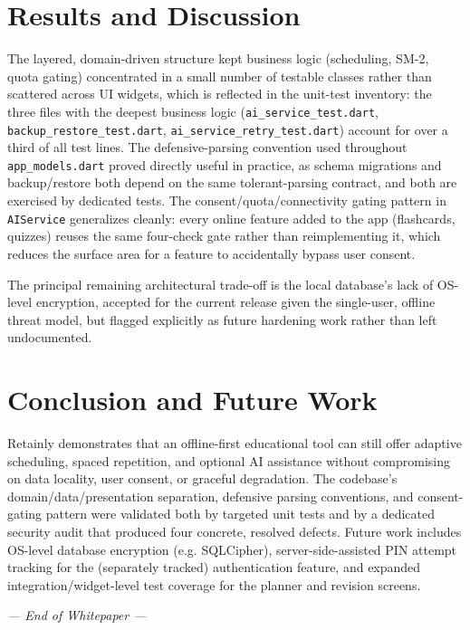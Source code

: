 \documentclass[11pt,a4paper]{article}
\begin{document}
\section{Results and Discussion}
The layered, domain-driven structure kept business logic (scheduling, SM-2, quota gating) concentrated in a small number of testable classes rather than scattered across UI widgets, which is reflected in the unit-test inventory: the three files with the deepest business logic (\texttt{ai\_service\_test.dart}, \texttt{backup\_restore\_test.dart}, \texttt{ai\_service\_retry\_test.dart}) account for over a third of all test lines. The defensive-parsing convention used throughout \texttt{app\_models.dart} proved directly useful in practice, as schema migrations and backup/restore both depend on the same tolerant-parsing contract, and both are exercised by dedicated tests. The consent/quota/connectivity gating pattern in \texttt{AIService} generalizes cleanly: every online feature added to the app (flashcards, quizzes) reuses the same four-check gate rather than reimplementing it, which reduces the surface area for a feature to accidentally bypass user consent.

The principal remaining architectural trade-off is the local database's lack of OS-level encryption, accepted for the current release given the single-user, offline threat model, but flagged explicitly as future hardening work rather than left undocumented.

\section{Conclusion and Future Work}
Retainly demonstrates that an offline-first educational tool can still offer adaptive scheduling, spaced repetition, and optional AI assistance without compromising on data locality, user consent, or graceful degradation. The codebase's domain/data/presentation separation, defensive parsing conventions, and consent-gating pattern were validated both by targeted unit tests and by a dedicated security audit that produced four concrete, resolved defects. Future work includes OS-level database encryption (e.g. SQLCipher), server-side-assisted PIN attempt tracking for the (separately tracked) authentication feature, and expanded integration/widget-level test coverage for the planner and revision screens.

\vspace{1cm}
\begin{center}
{\small\itshape --- End of Whitepaper ---}
\end{center}
\end{document}

